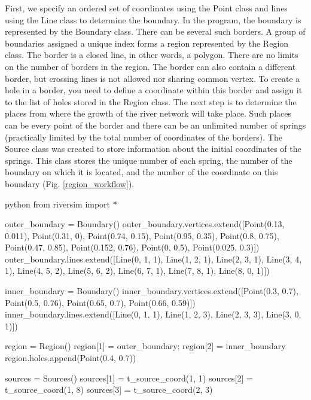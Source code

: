 \documentclass[]{pracamgr}
\begin{document}
      First, we specify an ordered set of coordinates using the Point class and lines using the Line class to determine the boundary. In the program, the boundary is represented by the Boundary class. There can be several such borders. A group of boundaries assigned a unique index forms a region represented by the Region class. The border is a closed line, in other words, a polygon. There are no limits on the number of borders in the region. The border can also contain a different border, but crossing lines is not allowed nor sharing common vertex. To create a hole in a border, you need to define a coordinate within this border and assign it to the list of holes stored in the Region class. The next step is to determine the places from where the growth of the river network will take place. Such places can be every point of the border and there can be an unlimited number of springs (practically limited by the total number of coordinates of the borders). The Source class was created to store information about the initial coordinates of the springs. This class stores the unique number of each spring, the number of the boundary on which it is located, and the number of the coordinate on this boundary (Fig. \ref{region_workflow}).

      \begin{mintedbox}{python}
        from riversim import *

        outer_boundary = Boundary()
        outer_boundary.vertices.extend([Point(0.13, 0.011), Point(0.31, 0), Point(0.74, 0.15), Point(0.95, 0.35), Point(0.8, 0.75), Point(0.47, 0.85), Point(0.152, 0.76), Point(0, 0.5), Point(0.025, 0.3)])
        outer_boundary.lines.extend([Line(0, 1, 1), Line(1, 2, 1), Line(2, 3, 1), Line(3, 4, 1), Line(4, 5, 2), Line(5, 6, 2), Line(6, 7, 1), Line(7, 8, 1), Line(8, 0, 1)])

        inner_boundary = Boundary()
        inner_boundary.vertices.extend([Point(0.3, 0.7), Point(0.5, 0.76), Point(0.65, 0.7), Point(0.66, 0.59)])
        inner_boundary.lines.extend([Line(0, 1, 1), Line(1, 2, 3), Line(2, 3, 3), Line(3, 0, 1)])

        region = Region()
        region[1] = outer_boundary; region[2] = inner_boundary
        region.holes.append(Point(0.4, 0.7))

        sources = Sources()
        sources[1] = t_source_coord(1, 1) 
        sources[2] = t_source_coord(1, 8) 
        sources[3] = t_source_coord(2, 3)\end{mintedbox}
\end{document}
